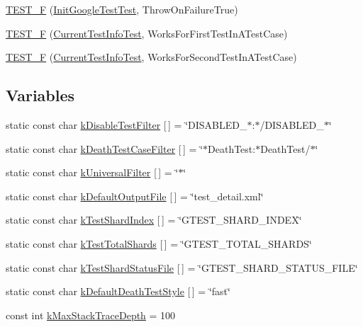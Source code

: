 \begin{DoxyCompactItemize}
\item 
\hyperlink{namespacetesting_ad7513c23ff21a4d2761cadfd2afe87e1}{\-T\-E\-S\-T\-\_\-\-F} (\hyperlink{classtesting_1_1InitGoogleTestTest}{\-Init\-Google\-Test\-Test}, \-Throw\-On\-Failure\-True)
\item 
\hyperlink{namespacetesting_a1e55a3ca18d877e1e83ce0ed9e7b5c79}{\-T\-E\-S\-T\-\_\-\-F} (\hyperlink{classtesting_1_1CurrentTestInfoTest}{\-Current\-Test\-Info\-Test}, \-Works\-For\-First\-Test\-In\-A\-Test\-Case)
\item 
\hyperlink{namespacetesting_a3775bdbb5d24619425c52103e7ae6434}{\-T\-E\-S\-T\-\_\-\-F} (\hyperlink{classtesting_1_1CurrentTestInfoTest}{\-Current\-Test\-Info\-Test}, \-Works\-For\-Second\-Test\-In\-A\-Test\-Case)
\end{DoxyCompactItemize}
\subsection*{\-Variables}
\begin{DoxyCompactItemize}
\item 
static const char \hyperlink{namespacetesting_a838f9d2c93a072f193aeb34809047179}{k\-Disable\-Test\-Filter} \mbox{[}$\,$\mbox{]} = \char`\"{}\-D\-I\-S\-A\-B\-L\-E\-D\-\_\-$\ast$\-:$\ast$/\-D\-I\-S\-A\-B\-L\-E\-D\-\_\-$\ast$\char`\"{}
\item 
static const char \hyperlink{namespacetesting_abece2ad88f181d37c5c8fb3e9dd0675a}{k\-Death\-Test\-Case\-Filter} \mbox{[}$\,$\mbox{]} = \char`\"{}$\ast$\-Death\-Test\-:$\ast$\-Death\-Test/$\ast$\char`\"{}
\item 
static const char \hyperlink{namespacetesting_a1bf2eaf73b98e0bc07b11550f91986a1}{k\-Universal\-Filter} \mbox{[}$\,$\mbox{]} = \char`\"{}$\ast$\char`\"{}
\item 
static const char \hyperlink{namespacetesting_a770a114e153c518bc30b271458d7591a}{k\-Default\-Output\-File} \mbox{[}$\,$\mbox{]} = \char`\"{}test\-\_\-detail.\-xml\char`\"{}
\item 
static const char \hyperlink{namespacetesting_a34e170fdd4ba4d2f80456cc37e2a8185}{k\-Test\-Shard\-Index} \mbox{[}$\,$\mbox{]} = \char`\"{}\-G\-T\-E\-S\-T\-\_\-\-S\-H\-A\-R\-D\-\_\-\-I\-N\-D\-E\-X\char`\"{}
\item 
static const char \hyperlink{namespacetesting_a9d9ddd278cfbb5834dea812d0de529be}{k\-Test\-Total\-Shards} \mbox{[}$\,$\mbox{]} = \char`\"{}\-G\-T\-E\-S\-T\-\_\-\-T\-O\-T\-A\-L\-\_\-\-S\-H\-A\-R\-D\-S\char`\"{}
\item 
static const char \hyperlink{namespacetesting_a9f1ab5ec024bf19381dff00e824f6ba7}{k\-Test\-Shard\-Status\-File} \mbox{[}$\,$\mbox{]} = \char`\"{}\-G\-T\-E\-S\-T\-\_\-\-S\-H\-A\-R\-D\-\_\-\-S\-T\-A\-T\-U\-S\-\_\-\-F\-I\-L\-E\char`\"{}
\item 
static const char \hyperlink{namespacetesting_a44b0987c442d84fba4334420c6b5ea74}{k\-Default\-Death\-Test\-Style} \mbox{[}$\,$\mbox{]} = \char`\"{}fast\char`\"{}
\item 
const int \hyperlink{namespacetesting_af923b7f5ce597d321ccd3f7e62afb270}{k\-Max\-Stack\-Trace\-Depth} = 100
\end{DoxyCompactItemize}


